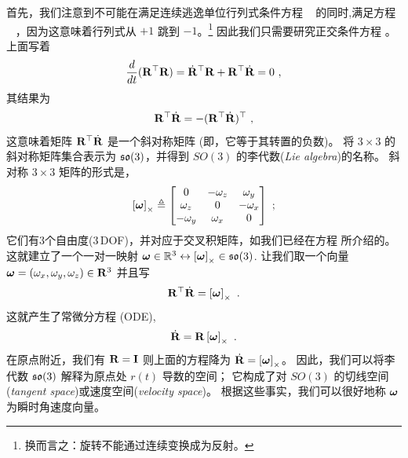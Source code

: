 首先，我们注意到不可能在满足连续逃逸单位行列式条件方程 ~ 的同时,满足方程 ~ ，因为这意味着行列式从 $+1$ 跳到 $-1$。\footnote{换而言之：旋转不能通过连续变换成为反射。}
因此我们只需要研究正交条件方程  。上面写着
%
\begin{align}
\frac{d}{dt}{({\bf R}^{\top}{\bf R})} = \dot{{\bf R}}^{\top}{\bf R}+{\bf R}^{\top}\dot{{\bf R}} = 0
~,
\end{align}
%
其结果为
%
\begin{align}
{\bf R}^{\top}\dot{{\bf R}} 
= -({\bf R}^{\top}\dot{{\bf R}})^{\top}
~,
\end{align}
%
这意味着矩阵 ${\bf R}^{\top}\dot{{\bf R}}$ 是一个斜对称矩阵 (即，它等于其转置的负数)。 
将 $3\times3$ 的斜对称矩阵集合表示为 ${\mathfrak {so}}(3)$，并得到 $SO(3)$ 的李代数(\emph{Lie algebra})的名称。
斜对称 $3\times3$ 矩阵的形式是，
%
\begin{align}
\left[{\bm \omega}\right]_\times \triangleq \begin{bmatrix}
0 & -\omega_z & \omega_y \\
\omega_z & 0 & -\omega_x \\
-\omega_y & \omega_x & 0
\end{bmatrix}
~;
\end{align}
%
它们有3个自由度(3\,DOF)，并对应于交叉积矩阵，如我们已经在方程  所介绍的。这就建立了一个一对一映射 ${\bm \omega}\in{\mathbb R}^3\leftrightarrow\left[{\bm \omega}\right]_\times\in{\mathfrak {so}}(3)$.
%
让我们取一个向量 ${\bm \omega}=(\omega_x,\omega_y,\omega_z)\in{\bf R}^3$ 并且写
%
\begin{align}
{\bf R}^{\top}\dot{{\bf R}} = \left[{\bm \omega}\right]_\times
~.
\end{align}
%
这就产生了常微分方程 (ODE),
%
\begin{align}
\label{equ:Rdot}
\dot{{\bf R}}={\bf R}\left[{\bm \omega}\right]_\times~.
\end{align}
%
在原点附近，我们有 ${\bf R}={\bf I}$ 则上面的方程降为 $\dot{{\bf R}}=\left[{\bm \omega}\right]_\times$。
因此，我们可以将李代数 ${\mathfrak {so}}(3)$ 解释为原点处 $r(t)$ 导数的空间；
它构成了对 $SO(3)$ 的切线空间(\emph{tangent space})或速度空间(\emph{velocity space})。
根据这些事实，我们可以很好地称 ${\bm \omega}$ 为瞬时角速度向量。 

